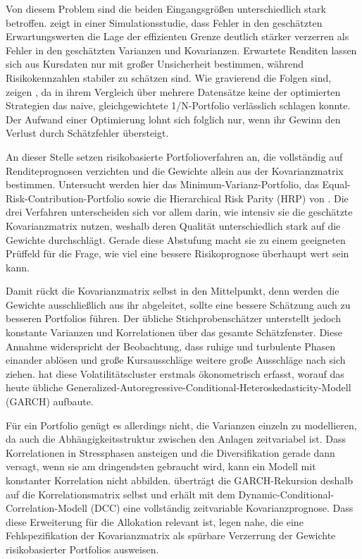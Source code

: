 \documentclass[12pt,a4paper]{article}
\begin{document}
Von diesem Problem sind die beiden Eingangsgrößen unterschiedlich stark betroffen.
\textcite{broadie1993} zeigt in einer Simulationsstudie, dass Fehler in den geschätzten Erwartungswerten die Lage der effizienten Grenze deutlich stärker verzerren als Fehler in den geschätzten Varianzen und Kovarianzen.
Erwartete Renditen lassen sich aus Kursdaten nur mit großer Unsicherheit bestimmen, während Risikokennzahlen stabiler zu schätzen sind.
Wie gravierend die Folgen sind, zeigen \textcite{demiguel2009}, da in ihrem Vergleich über mehrere Datensätze keine der optimierten Strategien das naive, gleichgewichtete 1/N-Portfolio verlässlich schlagen konnte.
Der Aufwand einer Optimierung lohnt sich folglich nur, wenn ihr Gewinn den Verlust durch Schätzfehler übersteigt.

An dieser Stelle setzen risikobasierte Portfolioverfahren an, die vollständig auf Renditeprognosen verzichten und die Gewichte allein aus der Kovarianzmatrix bestimmen.
Untersucht werden hier das Minimum-Varianz-Portfolio, das Equal-Risk-Contribution-Portfolio sowie die Hierarchical Risk Parity (HRP) von \textcite{deprado2016}.
Die drei Verfahren unterscheiden sich vor allem darin, wie intensiv sie die geschätzte Kovarianzmatrix nutzen, weshalb deren Qualität unterschiedlich stark auf die Gewichte durchschlägt.
Gerade diese Abstufung macht sie zu einem geeigneten Prüffeld für die Frage, wie viel eine bessere Risikoprognose überhaupt wert sein kann.

Damit rückt die Kovarianzmatrix selbst in den Mittelpunkt, denn werden die Gewichte ausschließlich aus ihr abgeleitet, sollte eine bessere Schätzung auch zu besseren Portfolios führen.
Der übliche Stichprobenschätzer unterstellt jedoch konstante Varianzen und Korrelationen über das gesamte Schätzfenster.
Diese Annahme widerspricht der Beobachtung, dass ruhige und turbulente Phasen einander ablösen und große Kursausschläge weitere große Ausschläge nach sich ziehen.
\textcite{engle1982} hat diese Volatilitätscluster erstmals ökonometrisch erfasst, worauf \textcite{bollerslev1986} das heute übliche Generalized-Autoregressive-Conditional-Heteroskedasticity-Modell (GARCH) aufbaute.

Für ein Portfolio genügt es allerdings nicht, die Varianzen einzeln zu modellieren, da auch die Abhängigkeitsstruktur zwischen den Anlagen zeitvariabel ist.
Dass Korrelationen in Stressphasen ansteigen und die Diversifikation gerade dann versagt, wenn sie am dringendsten gebraucht wird, kann ein Modell mit konstanter Korrelation nicht abbilden.
\textcite{engle2002} überträgt die GARCH-Rekursion deshalb auf die Korrelationsmatrix selbst und erhält mit dem Dynamic-Conditional-Correlation-Modell (DCC) eine vollständig zeitvariable Kovarianzprognose.
Dass diese Erweiterung für die Allokation relevant ist, legen \textcite{ardia2017} nahe, die eine Fehlspezifikation der Kovarianzmatrix als spürbare Verzerrung der Gewichte risikobasierter Portfolios ausweisen.
\end{document}
